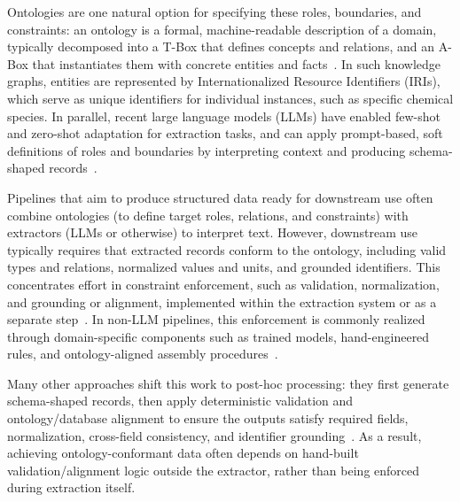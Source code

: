 Ontologies are one natural option for specifying these roles, boundaries, and constraints: an ontology is a formal, machine-readable description of a domain, typically decomposed into a T-Box that defines concepts and relations, and an A-Box that instantiates them with concrete entities and facts~\cite{gruber1993,guarino2009}. In such knowledge graphs, entities are represented by Internationalized Resource Identifiers (IRIs), which serve as unique identifiers for individual instances, such as specific chemical species. In parallel, recent large language models (LLMs) have enabled few-shot and zero-shot adaptation for extraction tasks, and can apply prompt-based, soft definitions of roles and boundaries by interpreting context and producing schema-shaped records~\cite{xu_large_2024}.


Pipelines that aim to produce structured data ready for downstream use often combine ontologies (to define target roles, relations, and constraints) with extractors (LLMs or otherwise) to interpret text. However, downstream use typically requires that extracted records conform to the ontology, including valid types and relations, normalized values and units, and grounded identifiers. This concentrates effort in constraint enforcement, such as validation, normalization, and grounding or alignment, implemented within the extraction system or as a separate step~\cite{wimalasuriya2010,martinezrodriguez2020,xu_large_2024}. In non-LLM pipelines, this enforcement is commonly realized through domain-specific components such as trained models, hand-engineered rules, and ontology-aligned assembly procedures~\cite{wimalasuriya2010,martinezrodriguez2020}.


Many other approaches shift this work to post-hoc processing: they first generate schema-shaped records, then apply deterministic validation and ontology/database alignment to ensure the outputs satisfy required fields, normalization, cross-field consistency, and identifier grounding~\cite{xu_large_2024,schilling-wilhelmi_text_2025,liu_we_2024,xu2023}. As a result, achieving ontology-conformant data often depends on hand-built validation/alignment logic outside the extractor, rather than being enforced during extraction itself.


